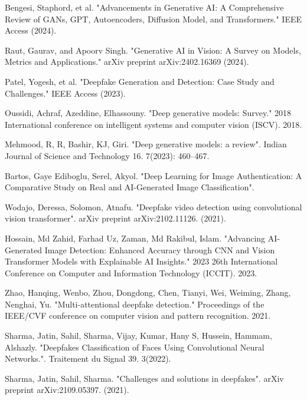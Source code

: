 \documentclass{svproc}
\begin{document}
%
%
\begin{thebibliography}{6}
%

Bengesi, Staphord, et al. "Advancements in Generative AI: A Comprehensive Review of GANs, GPT, Autoencoders, Diffusion Model, and Transformers." IEEE Access (2024).

Raut, Gaurav, and Apoorv Singh. "Generative AI in Vision: A Survey on Models, Metrics and Applications." arXiv preprint arXiv:2402.16369 (2024).

Patel, Yogesh, et al. "Deepfake Generation and Detection: Case Study and Challenges." IEEE Access (2023).


Oussidi, Achraf, Azeddine, Elhassouny. "Deep generative models: Survey." 2018 International conference on intelligent systems and computer vision (ISCV). 2018.

Mehmood, R, R, Bashir, KJ, Giri. "Deep generative models: a review". Indian Journal of Science and Technology 16. 7(2023): 460–467.

Bartos, Gaye Ediboglu, Serel, Akyol. "Deep Learning for Image Authentication: A Comparative Study on Real and AI-Generated Image Classification". 

Wodajo, Deressa, Solomon, Atnafu. "Deepfake video detection using convolutional vision transformer". arXiv preprint arXiv:2102.11126. (2021).

Hossain, Md Zahid, Farhad Uz, Zaman, Md Rakibul, Islam. "Advancing AI-Generated Image Detection: Enhanced Accuracy through CNN and Vision Transformer Models with Explainable AI Insights." 2023 26th International Conference on Computer and Information Technology (ICCIT). 2023.

Zhao, Hanqing, Wenbo, Zhou, Dongdong, Chen, Tianyi, Wei, Weiming, Zhang, Nenghai, Yu. "Multi-attentional deepfake detection." Proceedings of the IEEE/CVF conference on computer vision and pattern recognition. 2021.

Sharma, Jatin, Sahil, Sharma, Vĳay, Kumar, Hany S, Hussein, Hammam, Alshazly. "Deepfakes Classification of Faces Using Convolutional Neural Networks.". Traitement du Signal 39. 3(2022).

	Sharma, Jatin, Sahil, Sharma. "Challenges and solutions in deepfakes". arXiv preprint arXiv:2109.05397. (2021).


\end{thebibliography}
\end{document}
